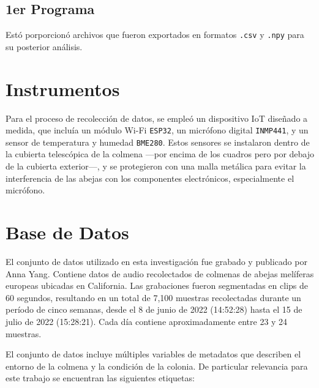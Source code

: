 \documentclass[12pt]{report}
\newenvironment{tightmulticols}{%
  \begin{multicols}{2}
  \setlength{\parskip}{0pt}
  \setlength{\parindent}{0em}
  \linespread{1}\selectfont
}{%
  \end{multicols}
}
\begin{document}
\begin{tightmulticols}
\subsection{1er Programa}

\par Estó porporcionó archivos que fueron exportados en formatos \texttt{.csv} y \texttt{.npy} para su posterior análisis.

\section{Instrumentos}

\par Para el proceso de recolección de datos, se empleó un dispositivo IoT diseñado a medida, que incluía un módulo Wi-Fi \texttt{ESP32}, un micrófono digital \texttt{INMP441}, y un sensor de temperatura y humedad \texttt{BME280}. Estos sensores se instalaron dentro de la cubierta telescópica de la colmena —por encima de los cuadros pero por debajo de la cubierta exterior—, y se protegieron con una malla metálica para evitar la interferencia de las abejas con los componentes electrónicos, especialmente el micrófono.

\section{Base de Datos}

\par El conjunto de datos utilizado en esta investigación fue grabado y publicado por Anna Yang\cite{AnnaYang-Dataset}. Contiene datos de audio recolectados de colmenas de abejas melíferas europeas ubicadas en California. Las grabaciones fueron segmentadas en clips de 60 segundos, resultando en un total de 7,100 muestras recolectadas durante un período de cinco semanas, desde el 8 de junio de 2022 (14:52:28) hasta el 15 de julio de 2022 (15:28:21). Cada día contiene aproximadamente entre 23 y 24 muestras.

\par El conjunto de datos incluye múltiples variables de metadatos que describen el entorno de la colmena y la condición de la colonia. De particular relevancia para este trabajo se encuentran las siguientes etiquetas:


\end{tightmulticols}
\end{document}
